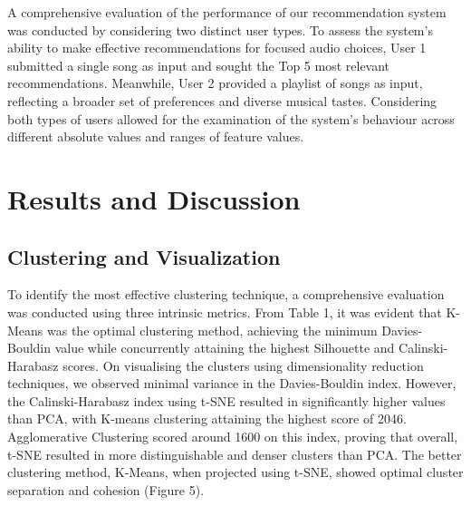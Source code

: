 \documentclass{article}
\begin{document}
A comprehensive evaluation of the performance of our recommendation system was conducted by considering two distinct user types. To assess the system's ability to make effective recommendations for focused audio choices, User 1 submitted a single song as input and sought the Top 5 most relevant recommendations. Meanwhile, User 2 provided a playlist of songs as input, reflecting a broader set of preferences and diverse musical tastes. Considering both types of users allowed for the examination of the system's behaviour across different absolute values and ranges of feature values.



\section{Results and Discussion}

\subsection{Clustering and Visualization}

To identify the most effective clustering technique, a comprehensive evaluation was conducted using three intrinsic metrics. From Table 1, it was evident that K-Means was the optimal clustering method, achieving the minimum Davies-Bouldin value while concurrently attaining the highest Silhouette and Calinski-Harabasz scores. On visualising the clusters using dimensionality reduction techniques, we observed minimal variance in the Davies-Bouldin index. However, the Calinski-Harabasz index using t-SNE resulted in significantly higher values than PCA, with K-means clustering attaining the highest score of 2046. Agglomerative Clustering scored around 1600 on this index, proving that overall, t-SNE resulted in more distinguishable and denser clusters than PCA. The better clustering method, K-Means, when projected using t-SNE, showed optimal cluster separation and cohesion (Figure 5).
\end{document}
